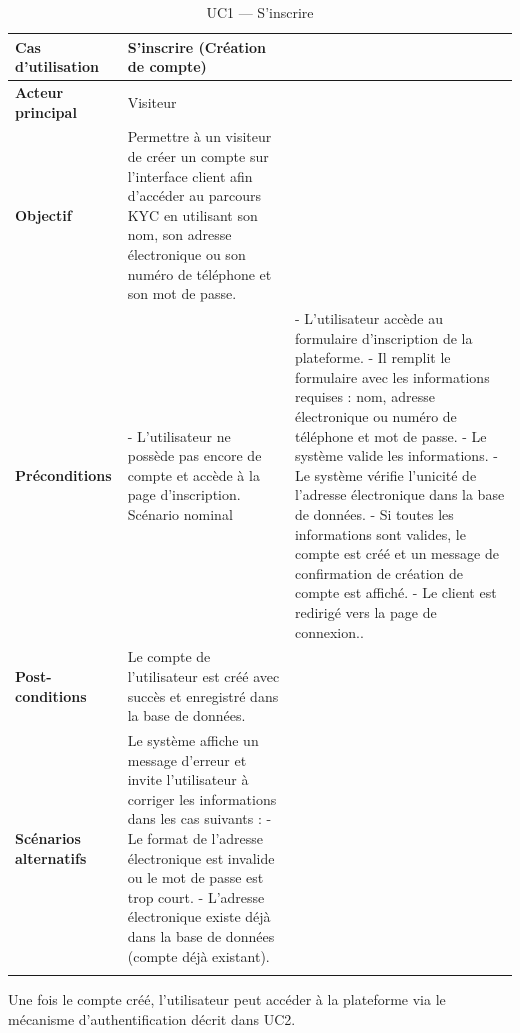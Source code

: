 \begin{longtable}{|>{\bfseries}p{3.8cm}|p{10.2cm}|}
  \hline
  Cas d'utilisation    & S'inscrire (Création de compte) \\
  \hline
  Acteur principal     & Visiteur \\
  \hline
  Objectif             & Permettre à un visiteur de créer un compte sur l'interface client afin d'accéder au parcours KYC en utilisant son nom, son adresse électronique ou son numéro de téléphone et son mot de passe. \\
  \hline
  Préconditions        &
    - L'utilisateur ne possède pas encore de compte et accède à la page d'inscription. \newline
  \hline
  Scénario nominal     &
    - L'utilisateur accède au formulaire d'inscription de la plateforme. \newline
    - Il remplit le formulaire avec les informations requises : nom, adresse électronique ou numéro de téléphone et mot de passe. \newline
    - Le système valide les informations.\newline
    - Le système vérifie l'unicité de l'adresse électronique dans la base de données. \newline
    - Si toutes les informations sont valides, le compte est créé et un message de confirmation de création de compte est affiché. \newline
    - Le client est redirigé vers la page de connexion.. \\
  \hline
  Post-conditions      & Le compte de l'utilisateur est créé avec succès et enregistré dans la base de données. \\
  \hline
  Scénarios alternatifs &
    Le système affiche un message d'erreur et invite l'utilisateur à corriger les informations dans les cas suivants : \newline
    - Le format de l'adresse électronique est invalide ou le mot de passe est trop court. \newline
    - L'adresse électronique existe déjà dans la base de données (compte déjà existant). \\
  \hline
  \caption{UC1 --- S'inscrire}
  \label{tab:uc1}
\end{longtable}

Une fois le compte créé, l'utilisateur peut accéder à la plateforme via le mécanisme d'authentification décrit dans UC2.

